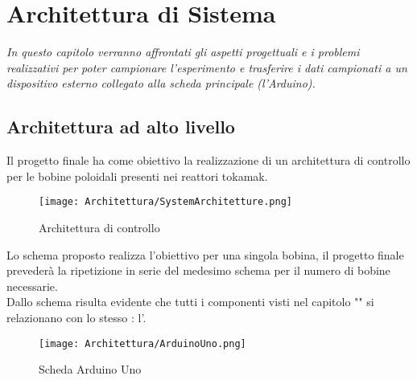 \chapter{Architettura di Sistema}\label{cap:Architettura}

\begin{minipage}{12cm}\textit{
		In questo capitolo verranno affrontati gli aspetti progettuali e i problemi realizzativi per poter campionare l'esperimento e trasferire i dati campionati a un dispositivo esterno collegato alla scheda principale (l'Arduino).
	}
\end{minipage}

\vspace*{1cm}

\section{Architettura ad alto livello}\label{sec:architettura}
Il progetto finale ha come obiettivo la realizzazione di un architettura di controllo per le bobine poloidali presenti nei reattori tokamak.

\begin{figure}[H] \label{fig:archietturaControllo}
	\centering
	\caption[Schema finale dell'archiettettura di controllo]{Architettura di controllo}
	\texttt{[image: Architettura/SystemArchitetture.png]}
\end{figure}

\noindent
Lo schema proposto realizza l'obiettivo per una singola bobina, il progetto finale prevederà la ripetizione in serie del medesimo schema per il numero di bobine necessarie.\\
Dallo schema risulta evidente che tutti i componenti visti nel capitolo "" si relazionano con lo stesso \microControllore: l'\ArduinoUno.
\begin{figure}[H]
	\centering
	\caption[Scheda Arduino Uno]{Scheda Arduino Uno}
	\texttt{[image: Architettura/ArduinoUno.png]}
\end{figure}

